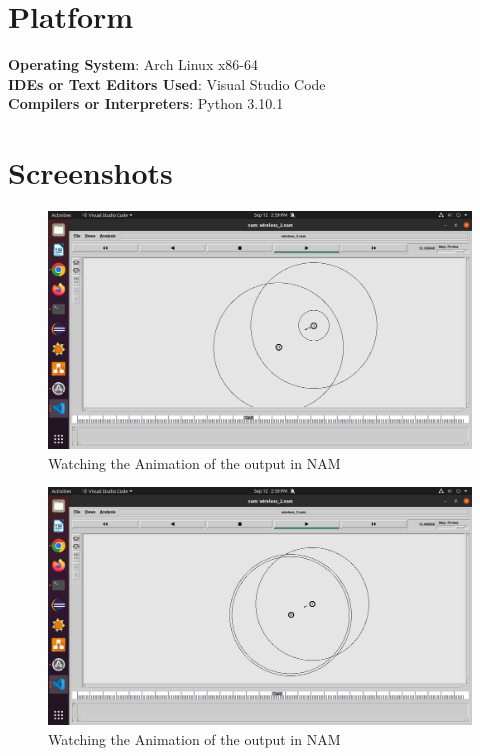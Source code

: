 \documentclass[11pt]{article}
\begin{document}
\section{Platform}
\textbf{Operating System}: Arch Linux x86-64 \\
\textbf{IDEs or Text Editors Used}: Visual Studio Code\\
\textbf{Compilers or Interpreters}: Python 3.10.1\\

\section{Screenshots}

\begin{figure}[H]
    \centering
    \includegraphics[width=.95\textwidth]{../../Programs/Assignment 2/Screenshots/1.jpeg}
    \caption{Watching the Animation of the output in NAM}
\end{figure}

\begin{figure}[H]
    \centering
    \includegraphics[width=.95\textwidth]{../../Programs/Assignment 2/Screenshots/2.jpeg}
    \caption{Watching the Animation of the output in NAM}
\end{figure}
\end{document}
